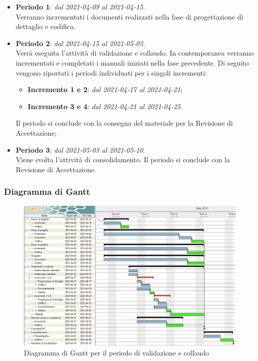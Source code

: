 \begin{itemize}
\item \textbf{Periodo 1}: \textit{dal 2021-04-09 al 2021-04-15}. \\
Verranno incrementati i documenti realizzati nella fase di progettazione di dettaglio e codifica.
\item \textbf{Periodo 2}: \textit{dal 2021-04-15 al 2021-05-03}. \\
Verrà eseguita l'attività di validazione e collaudo. In contemporanea verranno incrementati e completati i manuali iniziati nella fase precedente. Di seguito vengono riportati i periodi individuati per i singoli incrementi:
\begin{itemize}
\item \textbf{Incremento 1 e 2}: \textit{dal 2021-04-17 al 2021-04-21};
\item \textbf{Incremento 3 e 4}: \textit{dal 2021-04-21 al 2021-04-25}.
\end{itemize}
Il periodo si conclude con la consegna del materiale per la Revisione di Accettazione;
\item \textbf{Periodo 3}: \textit{dal 2021-05-03 al 2021-05-10}. \\
Viene svolta l'attività di consolidamento. Il periodo si conclude con la Revisione di Accettazione.
\end{itemize}

\subsubsection{Diagramma di Gantt}

\begin{figure}[H]
\centering

\centerline{\includegraphics[scale=0.6]{res/Pianificazione/Gantt/verifica}}
\caption{Diagramma di Gantt per il periodo di validazione e collaudo}
\end{figure}